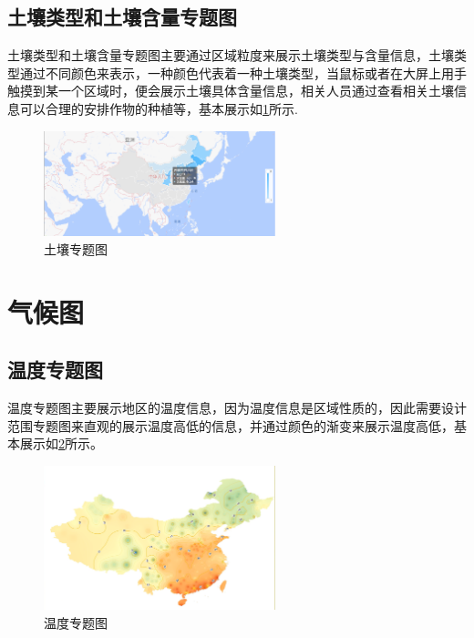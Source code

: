 \subsection{土壤类型和土壤含量专题图}
土壤类型和土壤含量专题图主要通过区域粒度来展示土壤类型与含量信息，土壤类型通过不同颜色来表示，一种颜色代表着一种土壤类型，当鼠标或者在大屏上用手触摸到某一个区域时，便会展示土壤具体含量信息，相关人员通过查看相关土壤信息可以合理的安排作物的种植等，基本展示如\ref{fig:turang}所示.
\begin{figure}[!htb]%
	\centering
	\includegraphics[width=0.60\textwidth]{figs/turang.png}
	\caption{土壤专题图}
	\label{fig:turang}
\end{figure}
\section{气候图}
\subsection{温度专题图}
温度专题图主要展示地区的温度信息，因为温度信息是区域性质的，因此需要设计范围专题图来直观的展示温度高低的信息，并通过颜色的渐变来展示温度高低，基本展示如\ref{fig:wendu}所示。
\begin{figure}[!htb]%
	\centering
	\includegraphics[width=0.60\textwidth]{figs/温度图.png}
	\caption{温度专题图}
	\label{fig:wendu}
\end{figure}
